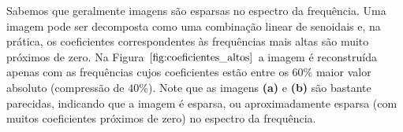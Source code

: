 Sabemos que geralmente imagens são esparsas no espectro da frequência. Uma imagem pode ser decomposta como uma combinação linear de senoidais e, na prática, os coeficientes correspondentes às frequências mais altas são muito próximos de zero. Na Figura $\ref{fig:coeficientes_altos}$ a imagem é reconstruída apenas com as frequências cujos coeficientes estão entre os $60\%$ maior valor absoluto (compressão de $40\%$). Note que as imagens {\bf (a)} e {\bf (b)} são bastante parecidas, indicando que a imagem é esparsa, ou aproximadamente esparsa (com muitos coeficientes próximos de zero) no espectro da frequência. 

